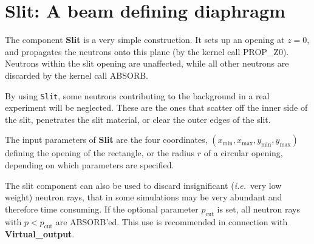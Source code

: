 \section{Slit: A beam defining diaphragm}
\label{slit}


The component \textbf{Slit} is a very simple construction.
It sets up an opening at $z=0$, and propagates the neutrons
onto this plane (by the kernel call PROP\_Z0).
Neutrons within the slit opening are unaffected,
while all other neutrons
are discarded by the kernel call ABSORB.

By using \texttt{Slit}, some neutrons contributing to the background
in a real experiment will be neglected.
These are the ones that scatter off the inner side
of the slit, penetrates the slit material,
or clear the outer edges of the slit.

The input parameters of \textbf{Slit} are the four coordinates,
$(x_\mathrm{min}, x_\mathrm{max}, y_\mathrm{min}, y_\mathrm{max})$
defining the opening of the rectangle, or the radius $r$ of
a circular opening, depending on which parameters are specified.

The slit component can also be used to discard insignificant 
({\em i.e.}\ very low weight)
neutron rays, that in some simulations may be very abundant and therefore
time consuming. If the optional parameter $p_\mathrm{cut}$ is set, all
neutron rays with $p<p_\mathrm{cut}$ are ABSORB'ed.
This use is recommended in connection with \textbf{Virtual\_output}.


